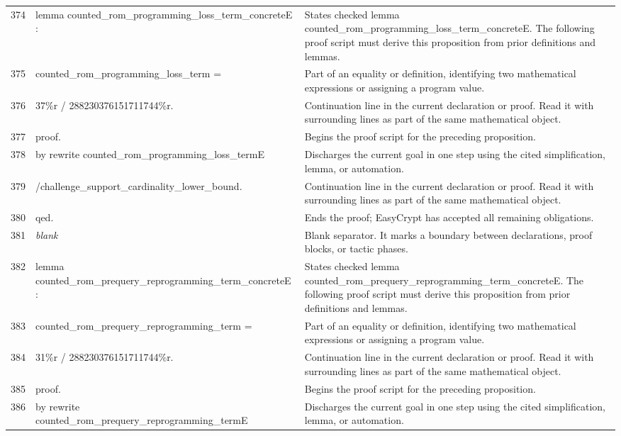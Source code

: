 \documentclass[10pt]{article}
\begin{document}
\begin{longtable}{r L{0.53\textwidth} L{0.37\textwidth}}
374 & {\ttfamily\scriptsize lemma counted\_rom\_programming\_loss\_term\_concreteE :} & States checked lemma counted\_rom\_programming\_loss\_term\_concreteE.  The following proof script must derive this proposition from prior definitions and lemmas. \\
375 & {\ttfamily\scriptsize   counted\_rom\_programming\_loss\_term =} & Part of an equality or definition, identifying two mathematical expressions or assigning a program value. \\
376 & {\ttfamily\scriptsize     37\%r / 288230376151711744\%r.} & Continuation line in the current declaration or proof.  Read it with surrounding lines as part of the same mathematical object. \\
377 & {\ttfamily\scriptsize proof.} & Begins the proof script for the preceding proposition. \\
378 & {\ttfamily\scriptsize by rewrite counted\_rom\_programming\_loss\_termE} & Discharges the current goal in one step using the cited simplification, lemma, or automation. \\
379 & {\ttfamily\scriptsize            /challenge\_support\_cardinality\_lower\_bound.} & Continuation line in the current declaration or proof.  Read it with surrounding lines as part of the same mathematical object. \\
380 & {\ttfamily\scriptsize qed.} & Ends the proof; EasyCrypt has accepted all remaining obligations. \\
381 & {\ttfamily\scriptsize \emph{blank}} & Blank separator.  It marks a boundary between declarations, proof blocks, or tactic phases. \\
382 & {\ttfamily\scriptsize lemma counted\_rom\_prequery\_reprogramming\_term\_concreteE :} & States checked lemma counted\_rom\_prequery\_reprogramming\_term\_concreteE.  The following proof script must derive this proposition from prior definitions and lemmas. \\
383 & {\ttfamily\scriptsize   counted\_rom\_prequery\_reprogramming\_term =} & Part of an equality or definition, identifying two mathematical expressions or assigning a program value. \\
384 & {\ttfamily\scriptsize     31\%r / 288230376151711744\%r.} & Continuation line in the current declaration or proof.  Read it with surrounding lines as part of the same mathematical object. \\
385 & {\ttfamily\scriptsize proof.} & Begins the proof script for the preceding proposition. \\
386 & {\ttfamily\scriptsize by rewrite counted\_rom\_prequery\_reprogramming\_termE} & Discharges the current goal in one step using the cited simplification, lemma, or automation. \\

\end{longtable}
\end{document}
